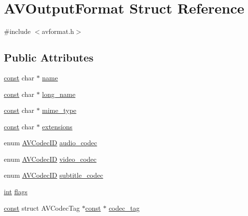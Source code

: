 \hypertarget{struct_a_v_output_format}{}\section{A\+V\+Output\+Format Struct Reference}
\label{struct_a_v_output_format}


{\ttfamily \#include $<$avformat.\+h$>$}

\subsection*{Public Attributes}
\begin{DoxyCompactItemize}
\item 
\hyperlink{getopt1_8c_a2c212835823e3c54a8ab6d95c652660e}{const} char $\ast$ \hyperlink{struct_a_v_output_format_ac3abc5f47f3465b6b7eec89c9476351c}{name}
\item 
\hyperlink{getopt1_8c_a2c212835823e3c54a8ab6d95c652660e}{const} char $\ast$ \hyperlink{struct_a_v_output_format_a4ff98d90aac0047a204a35a758a363fc}{long\+\_\+name}
\item 
\hyperlink{getopt1_8c_a2c212835823e3c54a8ab6d95c652660e}{const} char $\ast$ \hyperlink{struct_a_v_output_format_ad94e0c8bd362cb9ffbfc44514481fc75}{mime\+\_\+type}
\item 
\hyperlink{getopt1_8c_a2c212835823e3c54a8ab6d95c652660e}{const} char $\ast$ \hyperlink{struct_a_v_output_format_a10f19abe463890063659723c90c15335}{extensions}
\item 
enum \hyperlink{group__lavc__core_gaadca229ad2c20e060a14fec08a5cc7ce}{A\+V\+Codec\+ID} \hyperlink{struct_a_v_output_format_a2e4fff0aa061984d586ea08ecad96141}{audio\+\_\+codec}
\item 
enum \hyperlink{group__lavc__core_gaadca229ad2c20e060a14fec08a5cc7ce}{A\+V\+Codec\+ID} \hyperlink{struct_a_v_output_format_a1354a9c8542b1b698157218336bd4754}{video\+\_\+codec}
\item 
enum \hyperlink{group__lavc__core_gaadca229ad2c20e060a14fec08a5cc7ce}{A\+V\+Codec\+ID} \hyperlink{struct_a_v_output_format_adc8b4d7a5f6610e1816dd522e362217c}{subtitle\+\_\+codec}
\item 
\hyperlink{xmltok_8h_a5a0d4a5641ce434f1d23533f2b2e6653}{int} \hyperlink{struct_a_v_output_format_aad55a00e728a020c1dcfaaf695320445}{flags}
\item 
\hyperlink{getopt1_8c_a2c212835823e3c54a8ab6d95c652660e}{const} struct A\+V\+Codec\+Tag $\ast$\hyperlink{getopt1_8c_a2c212835823e3c54a8ab6d95c652660e}{const} $\ast$ \hyperlink{struct_a_v_output_format_ac55f4c21dd75c8c48b9de5080681eed4}{codec\+\_\+tag}

\end{DoxyCompactItemize}

